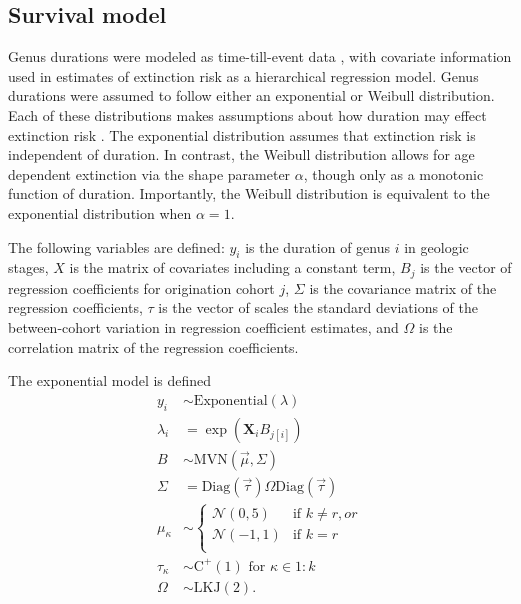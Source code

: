 \documentclass[12pt,letterpaper]{article}
\begin{document}
\subsection{Survival model}
Genus durations were modeled as time-till-event data \citep{Klein2003}, with covariate information used in estimates of extinction risk as a hierarchical regression model. Genus durations were assumed to follow either an exponential or Weibull distribution. Each of these distributions makes assumptions about how duration may effect extinction risk \citep{Klein2003}. The exponential distribution assumes that extinction risk is independent of duration. In contrast, the Weibull distribution allows for age dependent extinction via the shape parameter \(\alpha\), though only as a monotonic function of duration. Importantly, the Weibull distribution is equivalent to the exponential distribution when \(\alpha = 1\). 

The following variables are defined: \(y_{i}\) is the duration of genus \(i\) in geologic stages, \(X\) is the matrix of covariates including a constant term, \(B_{j}\) is the vector of regression coefficients for origination cohort \(j\), \(\Sigma\) is the covariance matrix of the regression coefficients, \(\tau\) is the vector of scales the standard deviations of the between-cohort variation in regression coefficient estimates, and \(\Omega\) is the correlation matrix of the regression coefficients.

The exponential model is defined
\begin{equation}
  \begin{aligned}
    y_{i} &\sim \mathrm{Exponential}(\lambda) \\
    \lambda_{i} &= \exp(\mathbf{X}_{i} B_{j[i]}) \\
    B &\sim \mathrm{MVN}(\vec{\mu}, \Sigma) \\
    \Sigma &= \text{Diag}(\vec{\tau}) \Omega \text{Diag}(\vec{\tau}) \\
    \mu_{\kappa} &\sim 
    \begin{cases} 
      \mathcal{N}(0, 5) & \text{if } k \neq r, or \\
      \mathcal{N}(-1, 1) & \text{if } k = r \\
    \end{cases} \\
    \tau_{\kappa} &\sim \mathrm{C^{+}}(1) \text{ for } \kappa \in 1:k \\
    \Omega &\sim \text{LKJ}(2).
  \end{aligned}
  \label{eq:exp_total}
\end{equation}
\end{document}

